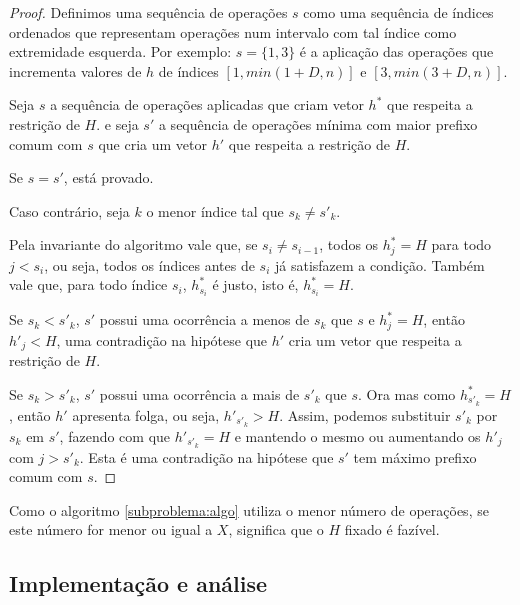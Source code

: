 \begin{proof}
    Definimos uma sequência de operações $s$ como uma sequência de índices ordenados que representam operações num intervalo com tal índice como extremidade esquerda. Por exemplo: $s = \{1, 3\}$ é a aplicação das operações que incrementa valores de $h$ de índices $[1, min(1 + D, n)]$ e $[3, min(3 + D, n)]$.
    
    Seja $s$ a sequência de operações aplicadas que criam vetor $h^*$ que respeita a restrição de $H$. e seja $s'$ a sequência de operações mínima com maior prefixo comum com $s$ que cria um vetor $h'$ que respeita a restrição de $H$.
    
    Se $s = s'$, está provado.

    Caso contrário, seja $k$ o menor índice tal que $s_k \neq s'_k$.

    Pela invariante do algoritmo vale que, se $s_i \neq s_{i - 1}$, todos os $h^*_j = H$ para todo $j < s_i$, ou seja, todos os índices antes de $s_i$ já satisfazem a condição. Também vale que, para todo índice $s_i$, $h^*_{s_i}$ é justo, isto é, $h^*_{s_i} = H$.

    Se $s_k < s'_k$, $s'$ possui uma ocorrência a menos de $s_k$ que $s$ e $h^*_j = H$, então $h'_j < H$, uma contradição na hipótese que $h'$ cria um vetor que respeita a restrição de $H$.

    Se $s_k > s'_k$, $s'$ possui uma ocorrência a mais de $s'_k$ que $s$. Ora mas como $h^*_{s'_k} = H$, então $h'$ apresenta folga, ou seja, $h'_{s'_k} > H$. Assim, podemos substituir $s'_k$ por $s_k$ em $s'$, fazendo com que $h'_{s'_k} = H$ e mantendo o mesmo ou aumentando os $h'_j$ com $j > s'_k$. Esta é uma contradição na hipótese que $s'$ tem máximo prefixo comum com $s$.

\end{proof}

Como o algoritmo \ref{subproblema:algo} utiliza o menor número de operações, se este número for menor ou igual a $X$, significa que o $H$ fixado é fazível.

\subsection*{Implementação e análise}

